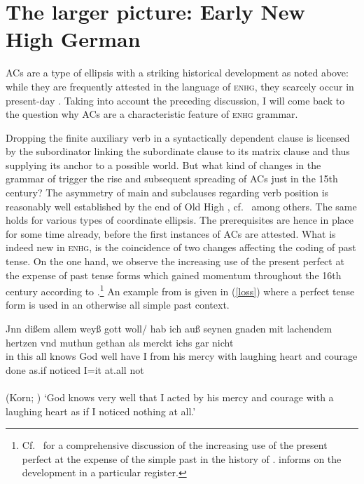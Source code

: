 \documentclass[output=paper,colorlinks,citecolor=brown]{langscibook}
\begin{document}
\section{The larger picture: Early New High German \label{enhg_context}}

ACs are a type of ellipsis with a striking historical development as noted above: while they are frequently attested in the language of \textsc{enhg}, they scarcely occur in present-day . Taking into account the preceding discussion, I will come back to the question why ACs are a characteristic feature of \textsc{enhg} grammar. 

Dropping the finite auxiliary verb in a syntactically dependent clause is licensed by the subordinator linking the subordinate clause to its matrix clause and thus supplying its anchor to a possible world. But what kind of changes in the grammar of  trigger the rise and subsequent spreading of ACs just in the 15th century? The asymmetry of main and subclauses regarding verb position is reasonably well established by the end of Old High , cf.\ \citet{axel2007} among others. The same holds for various types of coordinate ellipsis. The prerequisites are hence in place for some time already, before the first instances of ACs are attested. What is indeed new in \textsc{enhg}, is the coincidence of two changes affecting the coding of past tense. On the one hand, we observe the increasing use of the present perfect at the expense of past tense forms which gained momentum throughout the 16th century according to \citet{dentler1997}.\footnote{Cf.\ \citet{fischer2018} for a comprehensive discussion of the increasing use of the present perfect at the expense of the simple past in the history of . \citet{amft2018} informs on the development in a particular register.} An example from \citet{amft2018} is given in (\ref{loss}) where a perfect tense form is used in an otherwise all simple past context. 

\ea \label{loss}
\gll Jnn dißem allem weyß gott woll/ hab ich auß seynen gnaden mit lachendem hertzen vnd muthun gethan als merckt ichs gar nicht \\ in this all knows God well have I from his mercy with laughing heart and courage done as.if noticed I=it at.all not    \\ \\  \hfill (Korn; \citet[262]{amft2018})
\glt `God knows very well that I acted by his mercy and courage with a laughing heart as if I noticed nothing at all.'
\z
\end{document}

